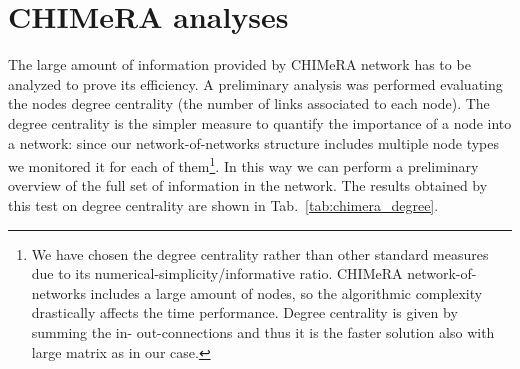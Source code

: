 \documentclass{standalone}
\begin{document}
\section[CHIMeRA analyses]{CHIMeRA analyses}\label{chimera:res}

The large amount of information provided by \textsf{CHIMeRA} network has to be analyzed to prove its efficiency.
A preliminary analysis was performed evaluating the nodes degree centrality (the number of links associated to each node).
The degree centrality is the simpler measure to quantify the importance of a node into a network: since our network-of-networks structure includes multiple node types we monitored it for each of them\footnote{
  We have chosen the degree centrality rather than other standard measures due to its numerical-simplicity/informative ratio.
  \textsf{CHIMeRA} network-of-networks includes a large amount of nodes, so the algorithmic complexity drastically affects the time performance.
  Degree centrality is given by summing the in- out-connections and thus it is the faster solution also with large matrix as in our case.
}.
In this way we can perform a preliminary overview of the full set of information in the network.
The results obtained by this test on degree centrality are shown in Tab.~\ref{tab:chimera_degree}.
\end{document}
